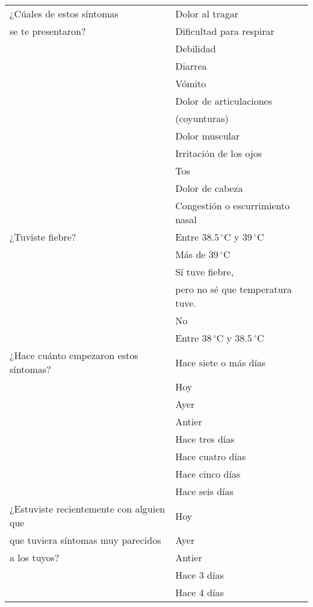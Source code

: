 \documentclass[letterpaper]{article}
\begin{document}
%
% 
% 

%
%
 \begin{longtable}{|l|l|} 
 \hline \endhead \hline \endfoot \hline 
¿Cúales de estos síntomas  & Dolor al tragar \\ 
se te presentaron? & Dificultad para respirar \\ 
 & Debilidad \\ 
 & Diarrea \\ 
 & Vómito \\ 
 & Dolor de articulaciones \\ 
 & (coyunturas) \\
 & Dolor muscular \\ 
 & Irritación de los ojos \\ 
 & Tos \\ 
 & Dolor de cabeza \\ 
 & Congestión o escurrimiento nasal \\ \hline 
¿Tuviste fiebre? & Entre $38.5\,^{\circ}\mathrm{C}$ y $39\,^{\circ}\mathrm{C}$\\ 
 & Más de $39\,^{\circ}\mathrm{C}$\\ 
 & Sí tuve fiebre, \\
 & pero no sé que temperatura tuve. \\ 
 & No \\ 
 & Entre $38\,^{\circ}\mathrm{C}$ y $38.5\,^{\circ}\mathrm{C}$ \\ \hline 
¿Hace cuánto empezaron estos síntomas? & Hace siete o más días \\ \hline 
 & Hoy \\ 
 & Ayer \\ 
 & Antier \\ 
 & Hace tres días \\ 
 & Hace cuatro días \\ 
 & Hace cinco días \\ 
 & Hace seis días \\ \hline 
¿Estuviste recientemente con alguien que & Hoy \\ 
 que tuviera síntomas muy parecidos & Ayer \\ 
 a los tuyos? & Antier \\ 
 & Hace 3 días \\ 
 & Hace 4 días \\ 

\end{longtable}
\end{document}
